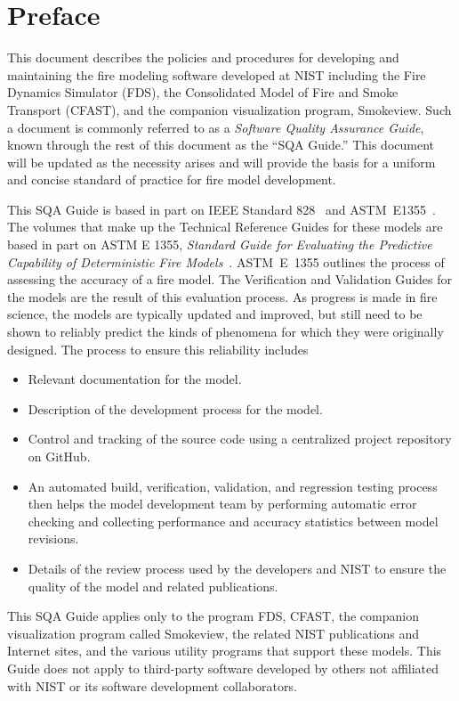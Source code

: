 \documentclass[11pt]{book}
\begin{document}
\newpage


\frontmatter

\pagestyle{plain}

%


\chapter{Preface}

This document describes the policies and procedures for developing and maintaining the fire modeling software developed at NIST including the Fire Dynamics Simulator (FDS), the Consolidated Model of Fire and Smoke Transport (CFAST), and the companion visualization program, Smokeview. Such a document is commonly referred to as a {\em Software Quality Assurance Guide}, known through the rest of this document as the ``SQA Guide.'' This document will be updated as the necessity arises and will provide the basis for a uniform and concise standard of practice for fire model development.

This SQA Guide is based in part on IEEE Standard 828~\cite{IEEE-828} and ASTM~E1355~\cite{ASTM:E1355}. The volumes that make up the Technical Reference Guides for these models are based in part on ASTM E 1355, {\em Standard Guide for Evaluating the Predictive Capability of Deterministic Fire Models}~\cite{ASTM:E1355}. ASTM~E~1355 outlines the process of assessing the accuracy of a fire model. The Verification and Validation Guides for the models are the result of this evaluation process. As progress is made in fire science, the models are typically updated and improved, but still need to be shown to reliably predict the kinds of phenomena for which they were originally designed. The process to ensure this reliability includes
\begin{itemize}
    \item Relevant documentation for the model.

    \item Description of the development process for the model.

    \item Control and tracking of the source code using a centralized project repository on GitHub.

    \item An automated build, verification, validation, and regression testing process then helps the model development team by performing automatic error checking and collecting performance and accuracy statistics between model revisions.

    \item Details of the review process used by the developers and NIST to ensure the quality of the model and related publications.

\end{itemize}
This SQA Guide applies only to the program FDS, CFAST, the companion visualization program called Smokeview,  the related NIST publications and Internet sites, and the various utility programs that support these models. This Guide does not apply to third-party software developed by others not affiliated with NIST or its software development collaborators.
\end{document}
